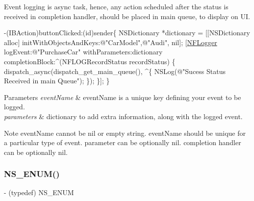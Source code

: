Event logging is async task, hence, any action scheduled after the status is received in completion handler, should be placed in main queue, to display on UI.


\begin{DoxyCode}
-(IBAction)buttonClicked:(\textcolor{keywordtype}{id})sender\{
 NSDictionary *dictionary = [[NSDictionary alloc] initWithObjectsAndKeys:\textcolor{stringliteral}{@"CarModel"},\textcolor{stringliteral}{@"Audi"}, nil];
 [\hyperlink{interface_n_f_logger}{NFLogger} logEvent:\textcolor{stringliteral}{@"PurchaseCar"} withParameters:dictionary completionBlock:^(NFLOGRecordStatus 
      recordStatus) \{
      dispatch\_async(dispatch\_get\_main\_queue(), ^\{
          NSLog(\textcolor{stringliteral}{@"Sucess Status Received in main Queue"});
          \});
  \}];
\}
\end{DoxyCode}



\begin{DoxyParams}{Parameters}
{\em event\+Name} & event\+Name is a unique key defining your event to be logged. \\
\hline
{\em parameters} & dictionary to add extra information, along with the logged event.\\
\hline
\end{DoxyParams}
\begin{DoxyNote}{Note}
event\+Name cannot be nil or empty string. event\+Name should be unique for a particular type of event. parameter can be optionally nil. completion handler can be optionally nil. 
\end{DoxyNote}
\mbox{\label{interface_n_f_logger_ab785af89c63637bf04e29bebc0d781de}} 
\subsubsection{\texorpdfstring{N\+S\+\_\+\+E\+N\+U\+M()}{NS\_ENUM()}\hspace{0.1cm}{\footnotesize\ttfamily [1/3]}}
{\footnotesize\ttfamily -\/ (typedef) N\+S\+\_\+\+E\+N\+UM \begin{DoxyParamCaption}\item[{(N\+S\+U\+Integer)}]{ }\item[{(N\+F\+L\+O\+G\+Record\+Status)}]{ }\end{DoxyParamCaption}}



